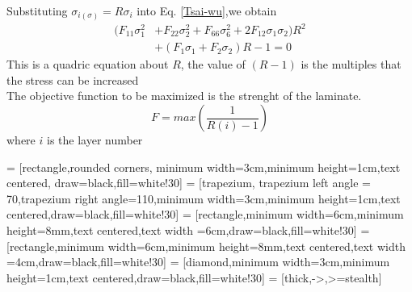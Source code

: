 \documentclass[smallextended]{svjour3}       %
\begin{document}
Substituting $\sigma_{i(\sigma)}=R\sigma_i$  into Eq. \ref{Tsai-wu},we obtain
\begin{equation}
	\begin{split}
		(F_{11}\sigma_1^2&+F_{22}\sigma_2^2+F_{66}\sigma_6^2+2F_{12}\sigma_1\sigma_2)R^2 \\
						 &+(F_1\sigma_1+F_2\sigma_2)R-1=0
	\end{split}
\end{equation}
This is a quadric equation about $R$, the value of $(R-1)$ is the multiples that the stress can be increased              \\
The objective function to be maximized is the strenght of the laminate.
\begin{equation}
	F=max(\frac{1}{R(i)-1})
\end{equation}
where $i$ is the layer number


 = [rectangle,rounded corners, minimum width=3cm,minimum height=1cm,text centered, draw=black,fill=white!30]
 = [trapezium, trapezium left angle = 70,trapezium right angle=110,minimum width=3cm,minimum height=1cm,text centered,draw=black,fill=white!30]
 = [rectangle,minimum width=6cm,minimum height=8mm,text centered,text width =6cm,draw=black,fill=white!30]
 = [rectangle,minimum width=6cm,minimum height=8mm,text centered,text width =4cm,draw=black,fill=white!30]
 = [diamond,minimum width=3cm,minimum height=1cm,text centered,draw=black,fill=white!30]
 = [thick,->,>=stealth]
\end{document}
